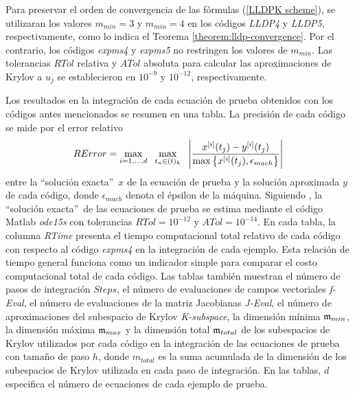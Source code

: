 Para preservar el orden de convergencia de las fórmulas (\ref{LLDPK scheme}), se utilizaran los valores $m_{min}=3$ y $m_{min}=4$ en los códigos \emph{LLDP4} y \emph{LLDP5}, respectivamente, como lo indica el Teorema \ref{theorem:lldp-convergence}. Por el contrario, los códigos \emph{expms4} y \emph{expms5} no restringen los valores de $m_{min}$. Las tolerancias $RTol$ relativa y $ATol$ absoluta para calcular las aproximaciones de Krylov a $u_j$ se establecieron en $10^{-9}$ y $10^{-12}$, respectivamente.

Los resultados en la integración de cada ecuación de prueba obtenidos con los códigos antes mencionados se resumen en una tabla. La precisión de cada código se mide por el error relativo
\begin{equation}\label{num-exp-lldp-fix-step:ER}
	RError = \max_{i=1,\ldots,d} \;\ \max_{t_n\in(t)_h}  \;\ \left\lvert\frac{x^{[i]}(t_j)-y^{[i]}(t_j)}{\maxx{x^{[i]}(t_j),\epsilon_{mach}}}\right\rvert
\end{equation}
entre la \textquotedblleft solución exacta\textquotedblright~$x$ de la ecuación de prueba y la solución aproximada $y$ de cada código, donde $\epsilon_{mach}$ denota el épsilon de la máquina. Siguiendo \cite{tokman2006efficient}, la \textquotedblleft solución exacta\textquotedblright~de las ecuaciones de prueba se estima mediante el código Matlab \textit{ode15s} con tolerancias $RTol=10^{-12}$ y $ATol=10^{-14}$. En cada tabla, la columna \textit{RTime} presenta el tiempo computacional total relativo de cada código con respecto al código \emph{expms4} en la integración de cada ejemplo. Esta relación de tiempo general funciona como un indicador simple para comparar el costo computacional total de cada código. Las tablas también muestran el número de pasos de integración $Steps$, el número de evaluaciones de campos vectoriales \textit{f-Eval}, el número de evaluaciones de la matriz Jacobianas \textit{J-Eval}, el número de aproximaciones del subespacio de Krylov \textit{K-subspace}, la dimensión mínima $\mathfrak{m}_{min}$, la dimensión máxima $\mathfrak{m}_{max}$ y la dimensión total $\mathfrak{m}_{total}$ de los subespacios de Krylov utilizados por cada código en la integración de las ecuaciones de prueba con tamaño de paso $h$, donde $m_{total}$ es la suma acumulada de la dimensión de los subespacios de Krylov utilizada en cada paso de integración. En las tablas, $d$ especifica el número de ecuaciones de cada ejemplo de prueba.

\vspace{0.5cm}

